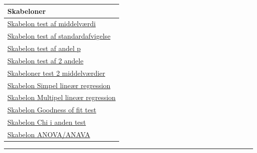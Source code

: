 \documentclass[]{book}
\begin{document}
\begin{longtable}[]{@{}l@{}}
\toprule
Skabeloner\tabularnewline
\midrule
\endhead
\href{https://www.dropbox.com/s/xygqhfe6wmxzntf/Skabelon\%20test\%20af\%20middelv\%C3\%A6rdi\%20\%CE\%BC.docx?dl=1}{Skabelon test af middelværdi}\tabularnewline
\href{https://www.dropbox.com/s/m3vmdo47f6ocza3/skabelon\%20test\%20af\%20standardafvigelse.docx?dl=1}{Skabelon test af standardafvigelse}\tabularnewline
\href{https://www.dropbox.com/s/vazc4t384xfw2vf/Skabelon\%20test\%20af\%20andel\%20p.docx?dl=1}{Skabelon test af andel p}\tabularnewline
\href{https://www.dropbox.com/s/wbu8gaasar0i991/Skabelon\%20test\%20af\%202\%20andele.docx?dl=1}{Skabelon test af 2 andele}\tabularnewline
\href{https://www.dropbox.com/s/9qv7i2xlt2ioiut/Skabeloner\%20test\%202\%20middelv\%C3\%A6rdier.docx?dl=1}{Skabeloner test 2 middelværdier}\tabularnewline
\href{https://www.dropbox.com/s/8ppxk89bapfh53p/Skabelon\%20Simpel\%20line\%C3\%A6r\%20regression.docx?dl=1}{Skabelon Simpel lineær regression}\tabularnewline
\href{https://www.dropbox.com/s/jghmkyl4ou66lim/Skabelon\%20Multipel\%20line\%C3\%A6r\%20regression\%20slutmodel.docx?dl=1}{Skabelon Multipel lineær regression}\tabularnewline
\href{https://www.dropbox.com/s/ectavp709wtmv6p/Skabelon\%20Goodness\%20of\%20fit\%20test.docx?dl=1}{Skabelon Goodness of fit test}\tabularnewline
\href{https://www.dropbox.com/s/gc0u8hdyrksa9jw/Skabelon\%20Chi\%20i\%20anden\%20test.docx?dl=1}{Skabelon Chi i anden test}\tabularnewline
\href{https://www.dropbox.com/s/9q9joeo1gv8ywky/Skabelon\%20ANOVA\%3AANAVA.docx?dl=1}{Skabelon ANOVA/ANAVA}\tabularnewline
\bottomrule
\end{longtable}

\begin{center}\rule{0.5\linewidth}{\linethickness}\end{center}
\end{document}
